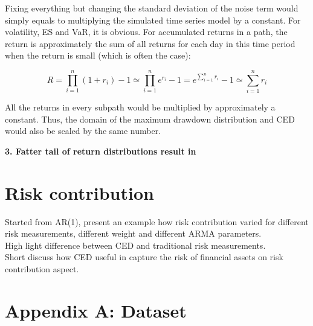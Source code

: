 \documentclass[11pt]{article}
\begin{document}
Fixing everything but changing the standard deviation of the noise term would simply equals to multiplying the simulated time series model by a constant. For volatility, ES and VaR, it is obvious. For accumulated returns in a path, the return is approximately the sum of all returns for each day in this time period when the return is small (which is often the case):

\begin{equation}
R = \prod_{i=1}^n (1+r_i) - 1 \simeq \prod_{i=1}^n e^{r_i} - 1 = e^{\sum_{i=1}^n r_i} - 1 
 \simeq  \sum_{i=1}^n r_i
\end{equation}

All the returns in every subpath would be multiplied by approximately a constant. Thus, the domain of the maximum drawdown distribution and CED would also be scaled by the same number.

\textbf{3. Fatter tail of return distributions result in }

\section{Risk contribution}
Started from AR(1), present an example how risk contribution varied for different risk measurements, different weight and different ARMA parameters.\\

High light difference between CED and traditional risk measurements.\\

Short discuss how CED useful in capture the risk of financial assets on risk contribution aspect.


\clearpage





\clearpage

\newpage
\appendix
\section{Appendix A: Dataset} \label{App:AppendixA}
\end{document}
